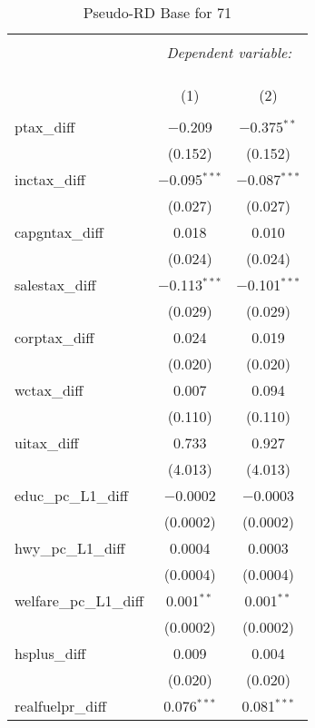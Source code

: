 
\begin{table}[!htbp] \centering 
  \caption{Pseudo-RD Base for  71} 
  \label{} 
\begin{tabular}{@{\extracolsep{5pt}}lcc} 
\\[-1.8ex]\hline 
\hline \\[-1.8ex] 
 & \multicolumn{2}{c}{\textit{Dependent variable:}} \\ 
\cline{2-3} 
\\[-1.8ex] & \multicolumn{2}{c}{ } \\ 
\\[-1.8ex] & (1) & (2)\\ 
\hline \\[-1.8ex] 
 ptax\_diff & $-$0.209 & $-$0.375$^{**}$ \\ 
  & (0.152) & (0.152) \\ 
  inctax\_diff & $-$0.095$^{***}$ & $-$0.087$^{***}$ \\ 
  & (0.027) & (0.027) \\ 
  capgntax\_diff & 0.018 & 0.010 \\ 
  & (0.024) & (0.024) \\ 
  salestax\_diff & $-$0.113$^{***}$ & $-$0.101$^{***}$ \\ 
  & (0.029) & (0.029) \\ 
  corptax\_diff & 0.024 & 0.019 \\ 
  & (0.020) & (0.020) \\ 
  wctax\_diff & 0.007 & 0.094 \\ 
  & (0.110) & (0.110) \\ 
  uitax\_diff & 0.733 & 0.927 \\ 
  & (4.013) & (4.013) \\ 
  educ\_pc\_L1\_diff & $-$0.0002 & $-$0.0003 \\ 
  & (0.0002) & (0.0002) \\ 
  hwy\_pc\_L1\_diff & 0.0004 & 0.0003 \\ 
  & (0.0004) & (0.0004) \\ 
  welfare\_pc\_L1\_diff & 0.001$^{**}$ & 0.001$^{**}$ \\ 
  & (0.0002) & (0.0002) \\ 
  hsplus\_diff & 0.009 & 0.004 \\ 
  & (0.020) & (0.020) \\ 
  realfuelpr\_diff & 0.076$^{***}$ & 0.081$^{***}$ \\ 

\end{tabular}
\end{table}
